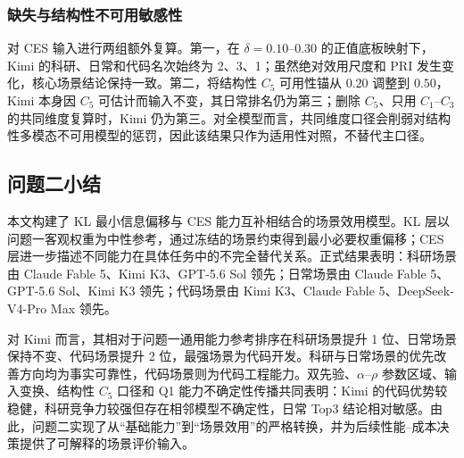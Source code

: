 \subsubsection{缺失与结构性不可用敏感性}

对 CES 输入进行两组额外复算。第一，在 $\delta=0.10$--$0.30$ 的正值底板映射下，Kimi 的科研、日常和代码名次始终为 2、3、1；虽然绝对效用尺度和 PRI 发生变化，核心场景结论保持一致。第二，将结构性 $C_5$ 可用性锚从 $0.20$ 调整到 $0.50$，Kimi 本身因 $C_5$ 可估计而输入不变，其日常排名仍为第三；删除 $C_5$、只用 $C_1$--$C_3$ 的共同维度复算时，Kimi 仍为第三。对全模型而言，共同维度口径会削弱对结构性多模态不可用模型的惩罚，因此该结果只作为适用性对照，不替代主口径。

\subsection{问题二小结}

本文构建了 KL 最小信息偏移与 CES 能力互补相结合的场景效用模型。KL 层以问题一客观权重为中性参考，通过冻结的场景约束得到最小必要权重偏移；CES 层进一步描述不同能力在具体任务中的不完全替代关系。正式结果表明：科研场景由 Claude Fable 5、Kimi K3、GPT-5.6 Sol 领先；日常场景由 Claude Fable 5、GPT-5.6 Sol、Kimi K3 领先；代码场景由 Kimi K3、Claude Fable 5、DeepSeek-V4-Pro Max 领先。

对 Kimi 而言，其相对于问题一通用能力参考排序在科研场景提升 1 位、日常场景保持不变、代码场景提升 2 位，最强场景为代码开发。科研与日常场景的优先改善方向均为事实可靠性，代码场景则为代码工程能力。双先验、$\alpha$--$\rho$ 参数区域、输入变换、结构性 $C_5$ 口径和 Q1 能力不确定性传播共同表明：Kimi 的代码优势较稳健，科研竞争力较强但存在相邻模型不确定性，日常 Top3 结论相对敏感。由此，问题二实现了从“基础能力”到“场景效用”的严格转换，并为后续性能--成本决策提供了可解释的场景评价输入。
